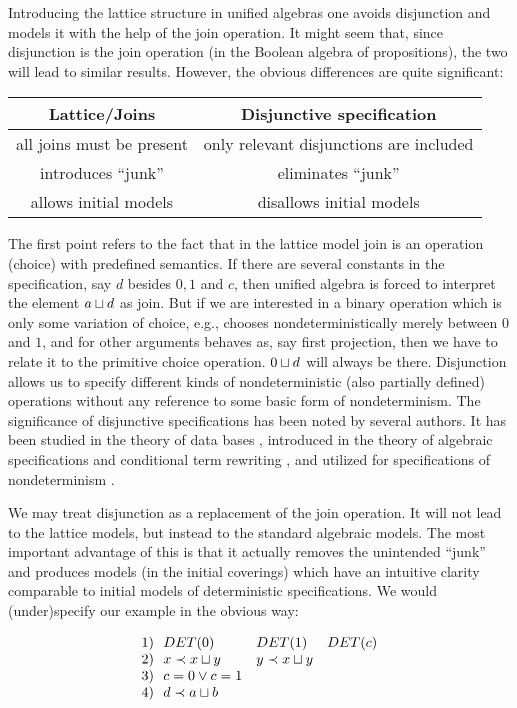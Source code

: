 {Introducing the lattice structure in unified algebras one avoids disjunction and models it with the help 
of the join operation. It might seem that, since disjunction is the join operation (in the Boolean algebra of 
propositions), the two will lead to similar results. However, the obvious differences are quite significant:
\begin{center}
\begin{tabular}{c@{\ \ }|@{\ \ }c}
	Lattice/Joins	 & Disjunctive specification  \\ \hline
	all joins must be present & 	only relevant disjunctions are 
	included \\
	introduces ``junk'' & 	eliminates ``junk'' \\
	allows initial models &	disallows initial models
\end{tabular}
\end{center}
The first point refers to the fact that in the lattice model join is an operation (choice) with predefined 
semantics. If there are several constants in the specification, say $d$ 
besides $0, 1$ and $c$, then unified algebra is 
forced to interpret the element $a\sqcup d$ as join. But if we are interested in a binary operation which is only 
some variation of choice, e.g., chooses nondeterministically merely between $0$ and $1$, and for other 
arguments behaves as, say first projection, then we have to relate it to 
the primitive choice operation. $0\sqcup d$
will always be there. Disjunction allows us to specify different kinds of nondeterministic (also partially 
defined) operations without any reference to some basic form of nondeterminism. The significance of 
disjunctive specifications has been noted by several authors. It has been studied in the theory of data bases 
\cite{c:37, c:124, c:125}, introduced in the theory of algebraic specifications and conditional 
term rewriting \cite{c:42, c:137, c:62}, and utilized for specifications of nondeterminism 
\cite{c:126, c:127, c:130}.

We may treat disjunction as a replacement of the join operation. It will not lead to the lattice models, 
but instead to the standard algebraic models. The most important advantage of this is that it actually 
removes the unintended ``junk'' and produces models (in the initial coverings) which have an intuitive 
clarity comparable to initial models of deterministic specifications. We would (under)specify our example 
in the obvious way:

\begin{Example}\label{ex:dis} 
\[ \begin{array}{l@{\ \ }lll}
	1) &	DET(0)   &     DET(1) &	DET(c)   \\
	2) &	x\Incl x\ch y  & 		y \Incl x\ch y \\
 	3) &	c=0 \lor c=1 \\
	4) &	d \Incl a\ch b
\end{array} \]
\end{Example}

}
